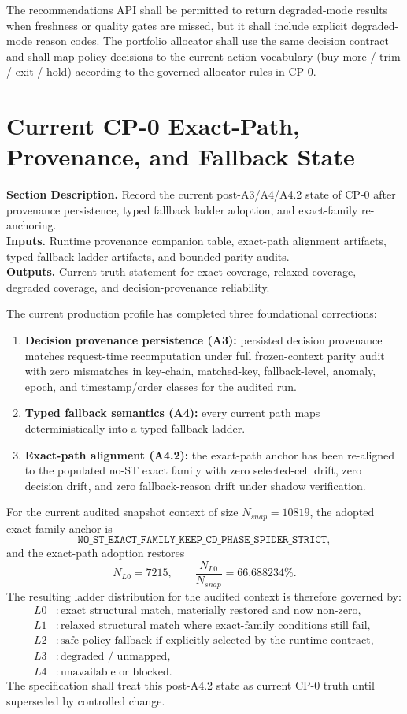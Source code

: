 \documentclass[11pt]{report}
\newcommand{\meta}[3]{\textbf{Section Description.} #1\\
\textbf{Inputs.} #2\\
\textbf{Outputs.} #3\par}
\begin{document}
The recommendations API shall be permitted to return degraded-mode results when freshness or quality gates are missed, but it shall include explicit degraded-mode reason codes. The portfolio allocator shall use the same decision contract and shall map policy decisions to the current action vocabulary (buy more / trim / exit / hold) according to the governed allocator rules in CP-0.

\section{Current CP-0 Exact-Path, Provenance, and Fallback State}
\meta{Record the current post-A3/A4/A4.2 state of CP-0 after provenance persistence, typed fallback ladder adoption, and exact-family re-anchoring.}{Runtime provenance companion table, exact-path alignment artifacts, typed fallback ladder artifacts, and bounded parity audits.}{Current truth statement for exact coverage, relaxed coverage, degraded coverage, and decision-provenance reliability.}

The current production profile has completed three foundational corrections:
\begin{enumerate}[leftmargin=1.2cm]
    \item \textbf{Decision provenance persistence (A3):} persisted decision provenance matches request-time recomputation under full frozen-context parity audit with zero mismatches in key-chain, matched-key, fallback-level, anomaly, epoch, and timestamp/order classes for the audited run.
    \item \textbf{Typed fallback semantics (A4):} every current path maps deterministically into a typed fallback ladder.
    \item \textbf{Exact-path alignment (A4.2):} the exact-path anchor has been re-aligned to the populated no-ST exact family with zero selected-cell drift, zero decision drift, and zero fallback-reason drift under shadow verification.
\end{enumerate}

For the current audited snapshot context of size $N_{snap}=10819$, the adopted exact-family anchor is
\[
\texttt{NO\_ST\_EXACT\_FAMILY\_KEEP\_CD\_PHASE\_SPIDER\_STRICT},
\]
and the exact-path adoption restores
\[
N_{L0}=7215,
\qquad
\frac{N_{L0}}{N_{snap}}=66.688234\%.
\]
The resulting ladder distribution for the audited context is therefore governed by:
\begin{align*}
L0 &: \text{exact structural match, materially restored and now non-zero},\\
L1 &: \text{relaxed structural match where exact-family conditions still fail},\\
L2 &: \text{safe policy fallback if explicitly selected by the runtime contract},\\
L3 &: \text{degraded / unmapped},\\
L4 &: \text{unavailable or blocked}.
\end{align*}
The specification shall treat this post-A4.2 state as current CP-0 truth until superseded by controlled change.
\end{document}
